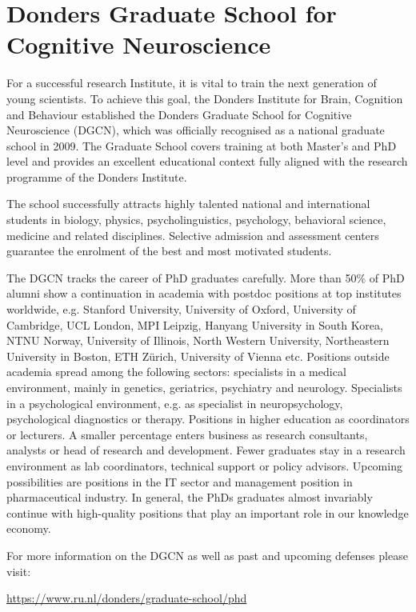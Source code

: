 
\section{Donders Graduate School for Cognitive Neuroscience}

For a successful research Institute, it is vital to train the next generation of young scientists. To achieve this goal, the Donders Institute for Brain, Cognition and Behaviour established the Donders Graduate School for Cognitive Neuroscience (DGCN), which was officially recognised as a national graduate school in 2009. The Graduate School covers training at both Master’s and PhD level and provides an excellent educational context fully aligned with the research programme of the Donders Institute.

The school successfully attracts highly talented national and international students in biology, physics, psycholinguistics, psychology, behavioral science, medicine and related disciplines. Selective admission and assessment centers guarantee the enrolment of the best and most motivated students.

The DGCN tracks the career of PhD graduates carefully. More than 50\% of PhD alumni show a continuation in academia with postdoc positions at top institutes worldwide, e.g. Stanford University, University of Oxford, University of Cambridge, UCL London, MPI Leipzig, Hanyang University in South Korea, NTNU Norway, University of Illinois, North Western University, Northeastern University in Boston, ETH Zürich, University of Vienna etc. Positions outside academia spread among the following sectors: specialists in a medical environment, mainly in genetics, geriatrics, psychiatry and neurology. Specialists in a psychological environment, e.g. as specialist in neuropsychology, psychological diagnostics or therapy. Positions in higher education as coordinators or lecturers. A smaller percentage enters business as research consultants, analysts or head of research and development. Fewer graduates stay in a research environment as lab coordinators, technical support or policy advisors. Upcoming possibilities are positions in the IT sector and management position in pharmaceutical industry. In general, the PhDs graduates almost invariably continue with high-quality positions that play an important role in our knowledge economy.

For more information on the DGCN as well as past and upcoming defenses please visit: 

\url{https://www.ru.nl/donders/graduate-school/phd}

